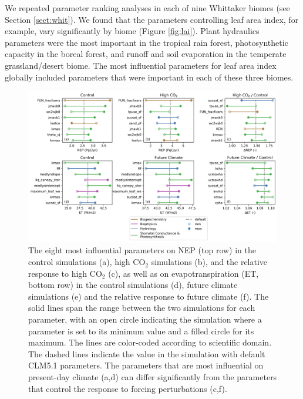 \documentclass[draft]{agujournal2019}
\begin{document}
We repeated parameter ranking analyses in each of nine Whittaker biomes (see Section \ref{sect:whit}). We found that the parameters controlling leaf area index, for example, vary significantly by biome (Figure \ref{fig:lai}). Plant hydraulics parameters were the most important in the tropical rain forest, photosynthetic capacity in the boreal forest, and runoff and soil evaporation in the temperate grassland/desert biome. The most influential parameters for leaf area index globally included parameters that were important in each of these three biomes. 

\begin{figure}[h]
\centering
\includegraphics[width=\textwidth]{../figs/main/deltas.png}
\caption{The eight most influential parameters  on NEP (top row) in the control simulations (a), high CO$_2$ simulations (b), and the relative response to high CO$_2$ (c), as well as on evapotranspiration (ET, bottom row) in the control simulations (d), future climate simulations (e) and the relative response to future climate (f).
The solid lines span the range between the two simulations for each parameter, with an open circle indicating the simulation where a parameter is set to its minimum value and a filled circle for its maximum. The lines are color-coded according to scientific domain. The dashed lines indicate the value in the simulation with default CLM5.1 parameters. 
The parameters that are most influential on present-day climate (a,d) can differ significantly from the parameters that control the response to forcing perturbations (c,f).}
\label{fig:nep}
\end{figure}
\end{document}
